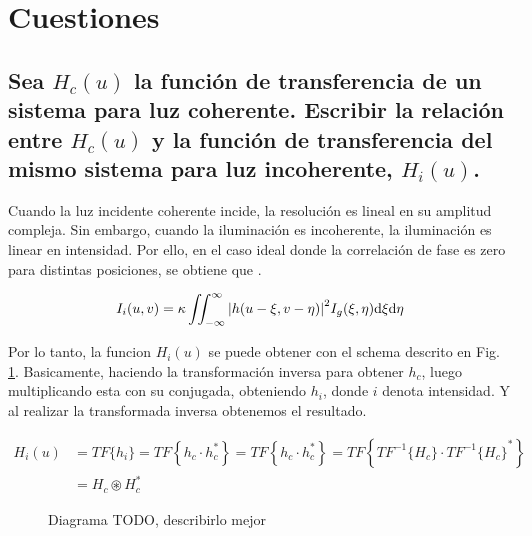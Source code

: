 \documentclass{./packages/optica-article}
\newcommand\conv{\circledast}
\begin{document}
\section{Cuestiones}

\subsection{Sea $H_{c}(u)$ la función de transferencia de un sistema para luz coherente. Escribir la relación entre $H_{c}(u)$ y la función de transferencia del mismo sistema para luz incoherente, $H_{i}(u)$.}

Cuando la luz incidente coherente incide, la resolución es lineal en su amplitud compleja. Sin embargo, cuando la iluminación es incoherente, la iluminación es linear en intensidad. Por ello, en el caso ideal donde la correlación de fase es zero para distintas posiciones, se obtiene que \cite[p.~132--134]{goodman1996introduction}.

\begin{equation}
	I_{i}(u,v) = \kappa \iint_{-\infty}^{\infty}\abs{h(u - \xi, v- \eta)}^{2} I_{g}(\xi, \eta) \dd \xi \dd \eta
\end{equation}

Por lo tanto, la funcion $H_{i}(u)$ se puede obtener con el schema descrito en Fig. \ref{fig:transformacion}. Basicamente, haciendo la transformación inversa para obtener $h_{c}$, luego multiplicando esta con su conjugada, obteniendo $h_{i}$, donde $i$ denota intensidad. Y al realizar la transformada inversa obtenemos el resultado.

\begin{align}
H_{i}(u) 
	&= TF\{h_i\} 
	= TF\left\{ h_{c} \cdot h^{*}_{c}\right\}
	= TF\left\{ h_{c} \cdot h^{*}_{c}\right\} 
	= TF\left\{ TF^{-1}\{H_{c}\} \cdot {TF^{-1}\{H_{c}\}}^{*}\right\} 
	\\
 &= H_{c} \conv H^{*}_{c}
\end{align}

\begin{figure}[htpb]
\begin{center}
\end{center}
\caption{Diagrama TODO, describirlo mejor}
\label{fig:transformacion}
\end{figure}
\end{document}
